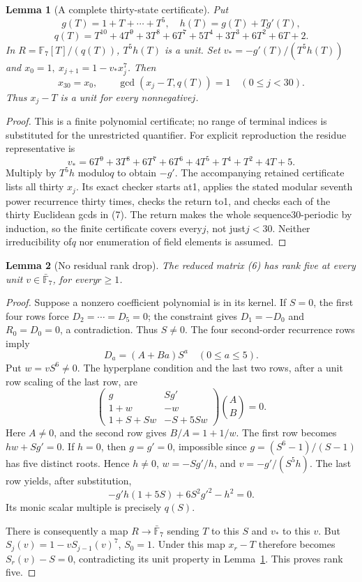 \documentclass[11pt]{article}
\newtheorem{lemma}{Lemma}
\begin{document}
\begin{lemma}[A complete thirty-state certificate]\label{lem:orbit}
Put
\[
 g(T)=1+T+\cdots+T^5,\quad h(T)=g(T)+Tg'(T),
\]
\[
 q(T)=T^{10}+4T^9+3T^8+6T^7+5T^4+3T^3+6T^2+6T+2.
\]
In $R=\mathbb F_7[T]/(q(T))$, $T^5h(T)$ is a unit.
Set $v_*=-g'(T)/(T^5h(T))$ and
$x_0=1,\ x_{j+1}=1-v_*x_j^7$. Then
\[
 x_{30}=x_0,\qquad
                  \gcd(x_j-T,q(T))=1\quad(0\le j<30).    \tag{7}
\]
Thus $x_j-T$ is a unit for every nonnegative$j$.
\end{lemma}
\begin{proof}
This is a finite polynomial certificate; no range of terminal
indices is substituted for the unrestricted quantifier.
For explicit reproduction the residue representative is
\[
 v_*=6T^9+3T^8+6T^7+6T^6+4T^5+T^4+T^2+4T+5.
\]
Multiply by $T^5h$ modulo$q$ to obtain $-g'$.
The accompanying retained certificate lists all thirty $x_j$.
Its exact checker starts at1, applies the stated modular seventh
power recurrence thirty times, checks the return to1, and checks
each of the thirty Euclidean gcds in (7).
The return makes the whole sequence30-periodic by induction,
so the finite certificate covers every$j$, not just$j<30$.
Neither irreducibility of$q$ nor enumeration of field elements
is assumed.
\end{proof}

\begin{lemma}[No residual rank drop]\label{lem:rank}
The reduced matrix (6) has rank five at every unit
$v\in\bar{\mathbb F}_7$, for every$r\ge1$.
\end{lemma}
\begin{proof}
Suppose a nonzero coefficient polynomial is in its kernel.
If $S=0$, the first four rows force $D_2=\cdots=D_5=0$;
the constraint gives $D_1=-D_0$ and $R_0=D_0=0$,
a contradiction. Thus $S\ne0$.
The four second-order recurrence rows imply
\[
                         D_a=(A+Ba)S^a\quad(0\le a\le5).
\]
Put $w=vS^6\ne0$.
The hyperplane condition and the last two rows, after a unit
row scaling of the last row, are
\[
 \begin{pmatrix}
 g&Sg'\\1+w&-w\\1+S+Sw&-S+5Sw
 \end{pmatrix}\binom AB=0.
\]
Here $A\ne0$, and the second row gives $B/A=1+1/w$.
The first row becomes $hw+Sg'=0$.
If $h=0$, then $g=g'=0$, impossible since
$g=(S^6-1)/(S-1)$ has five distinct roots.
Hence $h\ne0$, $w=-Sg'/h$, and
$v=-g'/(S^5h)$.
The last row yields, after substitution,
\[
 -g'h(1+5S)+6S^2g'^2-h^2=0.
\]
Its monic scalar multiple is precisely $q(S)$.

There is consequently a map $R\to\bar{\mathbb F}_7$ sending
$T$ to this $S$ and $v_*$ to this $v$.
But $S_j(v)=1-vS_{j-1}(v)^7$, $S_0=1$.
Under this map $x_r-T$ therefore becomes
$S_r(v)-S=0$, contradicting its unit property in
Lemma~\ref{lem:orbit}. This proves rank five.
\end{proof}
\end{document}
